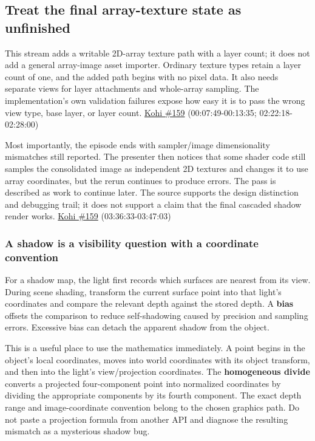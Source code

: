 \subsection{Treat the final array-texture state as unfinished}\label{06-engine-ii-ch026-treat-the-final-array-texture-state-as-unfinished}

\hypertarget{06-engine-ii-ch026-treat-the-final-array-texture-state-as-unfinished}{}

This stream adds a writable 2D-array texture path with a layer count; it does not add a general array-image asset importer. Ordinary texture types retain a layer count of one, and the added path begins with no pixel data. It also needs separate views for layer attachments and whole-array sampling. The implementation's own validation failures expose how easy it is to pass the wrong view type, base layer, or layer count. \href{https://www.youtube.com/watch?v=FrtHF-9K1HI}{Kohi \#159} (00:07:49-00:13:35; 02:22:18-02:28:00)

Most importantly, the episode ends with sampler/image dimensionality mismatches still reported. The presenter then notices that some shader code still samples the consolidated image as independent 2D textures and changes it to use array coordinates, but the rerun continues to produce errors. The pass is described as work to continue later. The source supports the design distinction and debugging trail; it does not support a claim that the final cascaded shadow render works. \href{https://www.youtube.com/watch?v=FrtHF-9K1HI}{Kohi \#159} (03:36:33-03:47:03)

\subsubsection{A shadow is a visibility question with a coordinate convention}\label{06-engine-ii-ch026-a-shadow-is-a-visibility-question-with-a-coordinate-convention}

\hypertarget{06-engine-ii-ch026-a-shadow-is-a-visibility-question-with-a-coordinate-convention}{}

For a shadow map, the light first records which surfaces are nearest from its view. During scene shading, transform the current surface point into that light's coordinates and compare the relevant depth against the stored depth. A \textbf{bias} offsets the comparison to reduce self-shadowing caused by precision and sampling errors. Excessive bias can detach the apparent shadow from the object.

This is a useful place to use the mathematics immediately. A point begins in the object's local coordinates, moves into world coordinates with its object transform, and then into the light's view/projection coordinates. The \textbf{homogeneous divide} converts a projected four-component point into normalized coordinates by dividing the appropriate components by its fourth component. The exact depth range and image-coordinate convention belong to the chosen graphics path. Do not paste a projection formula from another API and diagnose the resulting mismatch as a mysterious shadow bug.

